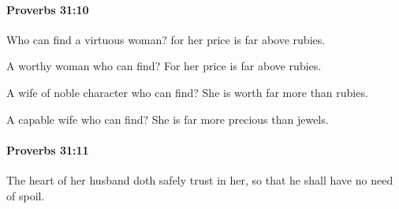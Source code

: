 		\paragraph{Proverbs 31:10} %
			\label{PROVERBS-31-10}

			Who can find a virtuous woman? for her price is far above rubies.

			\begin{versebox}
					\item[BHS] 
					\item[ASV] A worthy woman who can find? For her price is far above rubies.
					\item[NIV] A wife of noble character who can find? She is worth far more than rubies.
					\item[NRSV] A capable wife who can find? She is far more precious than jewels.
			\end{versebox}

		\paragraph{Proverbs 31:11} %
			\label{PROVERBS-31-11}

			The heart of her husband doth safely trust in her, so that he shall have no need of spoil.

